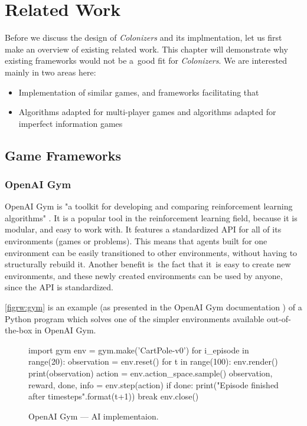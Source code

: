 \chapter{Related Work}

Before we discuss the design of \emph{Colonizers} and its implmentation,
let us first make an overview of existing related work. This chapter will
demonstrate why existing frameworks would not be a~good fit for \emph{Colonizers}.
We are interested mainly in two areas here:
\begin{itemize}
    \item Implementation of similar games, and frameworks facilitating that
    \item Algorithms adapted for multi-player games and algorithms adapted
        for imperfect information games
\end{itemize}

\section{Game Frameworks}

\subsection{OpenAI Gym}

OpenAI Gym is "a toolkit for developing and comparing reinforcement learning algorithms"
\cite{Openaigym}. It is a popular tool in the reinforcement learning field,
because it is modular, and easy to work with. It features a standardized API for
all of its environments (games or problems). This means that agents built for one
environment can be easily transitioned to other environments, without having to
structurally rebuild it. Another benefit is~the fact that it~is easy to create
new environments, and these newly created environments can be used by anyone,
since the API is standardized.

\autoref{figrw:gym} is an example (as presented in the OpenAI Gym documentation
\cite{Openaigym}) of a Python program which solves one of the simpler environments
available out-of-the-box in OpenAI Gym.

\begin{figure}[h!]
\begin{code}
import gym
env = gym.make('CartPole-v0')
for i_episode in range(20):
    observation = env.reset()
    for t in range(100):
        env.render()
        print(observation)
        action = env.action_space.sample()
        observation, reward, done, info = env.step(action)
        if done:
            print("Episode finished after {} timesteps".format(t+1))
            break
env.close()
\end{code}
\caption{OpenAI Gym --- AI implementaion.}\label{figrw:gym}
\end{figure}

